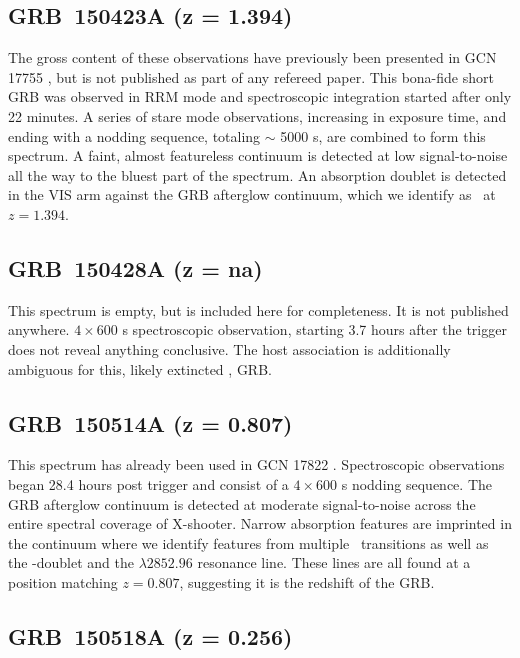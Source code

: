 \documentclass[longauth]{aa}    %
\begin{document}
\subsection{GRB~150423A (z = 1.394)}\label{150423}

The gross content of these observations have previously been presented in GCN
17755 \citep{GCN17755}, but is not published as part of any refereed paper. This
bona-fide short GRB \citep[T90 = is $ 0.22 \pm 0.03$ s;][]{Lien2016} was
observed in RRM mode and spectroscopic integration started after only 22
minutes. A series of stare mode observations, increasing in exposure time, and
ending with a nodding sequence, totaling $\sim$ 5000 s, are combined to form
this spectrum. A faint, almost featureless continuum is detected at low
signal-to-noise all the way to the bluest part of the spectrum. An absorption
doublet is detected in the VIS arm against the GRB afterglow continuum, which we
identify as \mgii~at $z = 1.394$.

\subsection{GRB~150428A (z = na)}	\label{150428}

This spectrum is empty, but is included here for completeness. It is not
published anywhere. $4\times600$ s spectroscopic observation, starting 3.7
hours after the trigger does not reveal anything conclusive. The host
association is additionally ambiguous for this, likely extincted \citep[GCN
17767;][]{GCN17767}, GRB.

\subsection{GRB~150514A (z = 0.807)}\label{150514}

This spectrum has already been used in GCN 17822 \citep{GCN17822}. Spectroscopic
observations began 28.4 hours post trigger and consist of a $4 \times 600$ s
nodding sequence. The GRB afterglow continuum is detected at moderate
signal-to-noise across the entire spectral coverage of X-shooter. Narrow
absorption features are imprinted in the continuum where we identify features
from multiple \feii~transitions as well as the \mgii-doublet and the
\mgi$\lambda2852.96$ resonance line. These lines are all found at a position
matching $z = 0.807$, suggesting it is the redshift of the GRB.

\subsection{GRB~150518A (z = 0.256)}\label{150518}
\end{document}
